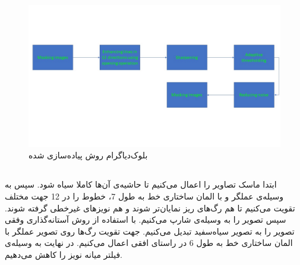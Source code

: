 \documentclass{article}
\begin{document}
\subsection{}
\begin{figure}[H]
    \centering
    \includegraphics[width=1.0\textwidth]{figures/3.jpg}
    \caption
	{
بلوک‌دیاگرام روش پیاده‌سازی شده
	}
    \label{fig:fig1}
\end{figure}

\subsection{}
ابتدا ماسک تصاویر را اعمال می‌کنیم تا حاشیه‌ی آن‌ها کاملا سیاه شود. سپس به وسیله‌ی عملگر  و با المان ساختاری خط به طول 7، خطوط را در 12 جهت مختلف تقویت می‌کنیم تا هم رگ‌های ریز نمایان‌تر شوند و هم نویز‌های غیرخطی گرفته شوند. سپس تصویر را به وسیله‌ی  شارپ می‌کنیم. با استفاده از روش آستانه‌گذاری وفقی تصویر را به تصویر سیاه‌سفید تبدیل می‌کنیم. جهت تقویت رگ‌ها روی تصویر عملگر  با المان ساختاری خط به طول 6 در راستای افقی اعمال می‌کنیم. در نهایت به وسیله‌ی فیلتر میانه نویز را کاهش می‌دهیم.

\subsection{}
\begin{latin}

\end{latin}

\subsection{}
\end{document}
